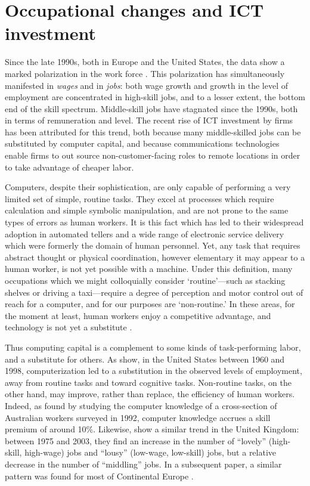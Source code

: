 \chapter{Occupational changes and ICT investment}

Since the late 1990s, both in Europe and the United States, the data show a marked polarization in the work force \citep{Goos2007, Autor2006}. This polarization has simultaneously manifested in \emph{wages} and in \emph{jobs}: both wage growth and growth in the level of employment are concentrated in high-skill jobs, and to a lesser extent, the bottom end of the skill spectrum. Middle-skill jobs have stagnated since the 1990s, both in terms of remuneration and level. The recent rise of ICT investment by firms has been attributed for this trend, both because many middle-skilled jobs can be substituted by computer capital, and because communications technologies enable firms to out source non-customer-facing roles to remote locations in order to take advantage of cheaper labor.

Computers, despite their sophistication, are only capable of performing a very limited set of simple, routine tasks. They excel at processes which require calculation and simple symbolic manipulation, and are not prone to the same types of errors as human workers. It is this fact which has led to their widespread adoption in automated tellers and a wide range of electronic service delivery which were formerly the domain of human personnel. Yet, any task that requires abstract thought or physical coordination, however elementary it may appear to a human worker, is not yet possible with a machine. Under this definition, many occupations which we might colloquially consider `routine'---such as stacking shelves or driving a taxi---require a degree of perception and motor control out of reach for a computer, and for our purposes are `non-routine.' In these areas, for the moment at least, human workers enjoy a competitive advantage, and technology is not yet a substitute \citep{Levy2003}.

Thus computing capital is a complement to some kinds of task-performing labor, and a substitute for others. As \citet{Levy2003} show, in the United States between 1960 and 1998, computerization led to a substitution in the observed levels of employment, away from routine tasks and toward cognitive tasks. Non-routine tasks, on the other hand, may improve, rather than replace, the efficiency of human workers. Indeed, as \citet{Borland2004} found by studying the computer knowledge of a cross-section of Australian workers surveyed in 1992, computer knowledge accrues a skill premium of around 10\%. Likewise, \citet{Goos2007} show a similar trend in the United Kingdom: between 1975 and 2003, they find an increase in the number of ``lovely'' (high-skill, high-wage) jobs and ``lousy'' (low-wage, low-skill) jobs, but a relative decrease in the number of ``middling'' jobs. In a subsequent paper, a similar pattern was found for most of Continental Europe \citep{Goos2009}.

